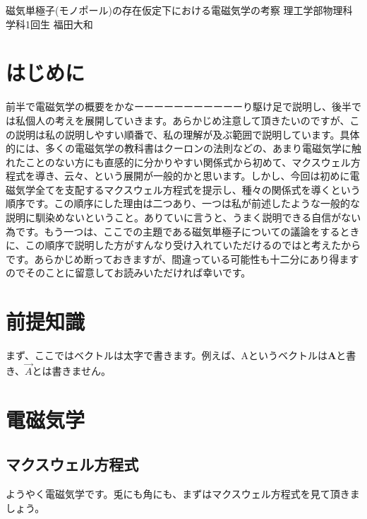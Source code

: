 \documentclass[10pt,b5paper,papersize,dvipdfmx]{jsbook}
\begin{document}

\kaishititle%
  {磁気単極子(モノポール)の存在仮定下における電磁気学の考察}%
  {理工学部物理科学科1回生}%
  {福田大和}%


\section*{はじめに}
前半で電磁気学の概要をかなーーーーーーーーーーーり駆け足で説明し、後半では私個人の考えを展開していきます。あらかじめ注意して頂きたいのですが、この説明は私の説明しやすい順番で、私の理解が及ぶ範囲で説明しています。具体的には、多くの電磁気学の教科書はクーロンの法則などの、あまり電磁気学に触れたことのない方にも直感的に分かりやすい関係式から初めて、マクスウェル方程式を導き、云々、という展開が一般的かと思います。しかし、今回は初めに電磁気学全てを支配するマクスウェル方程式を提示し、種々の関係式を導くという順序です。この順序にした理由は二つあり、一つは私が前述したような一般的な説明に馴染めないということ。ありていに言うと、うまく説明できる自信がない為です。もう一つは、ここでの主題である磁気単極子についての議論をするときに、この順序で説明した方がすんなり受け入れていただけるのではと考えたからです。あらかじめ断っておきますが、間違っている可能性も十二分にあり得ますのでそのことに留意してお読みいただければ幸いです。

\section{前提知識}
まず、ここではベクトルは太字で書きます。例えば、Aというベクトルは$\mathbf{A}$と書き、$\vec{A}$とは書きません。

\section{電磁気学}
\subsection{マクスウェル方程式}
ようやく電磁気学です。兎にも角にも、まずはマクスウェル方程式を見て頂きましょう。
\end{document}
